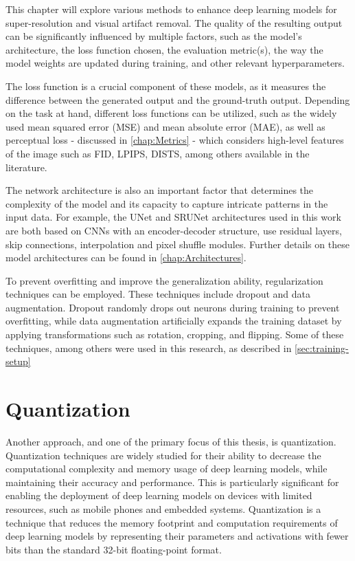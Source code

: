 \label{chap:Optimizations}

This chapter will explore various methods to enhance deep learning models for super-resolution and visual artifact removal. The quality of the resulting output can be significantly influenced by multiple factors, such as the model's architecture, the loss function chosen, the evaluation metric(s), the way the model weights are updated during training, and other relevant hyperparameters.

The loss function is a crucial component of these models, as it measures the difference between the generated output and the ground-truth output. Depending on the task at hand, different loss functions can be utilized, such as the widely used mean squared error (MSE) and mean absolute error (MAE), as well as perceptual loss - discussed in \cref{chap:Metrics} - which considers high-level features of the image such as FID, LPIPS, DISTS, among others available in the literature.

The network architecture is also an important factor that determines the complexity of the model and its capacity to capture intricate patterns in the input data. For example, the UNet and SRUNet architectures used in this work are both based on CNNs with an encoder-decoder structure, use residual layers, skip connections, interpolation and pixel shuffle modules. Further details on these model architectures can be found in \cref{chap:Architectures}.

To prevent overfitting and improve the generalization ability, regularization techniques can be employed. These techniques include dropout and data augmentation. Dropout randomly drops out neurons during training to prevent overfitting, while data augmentation artificially expands the training dataset by applying transformations such as rotation, cropping, and flipping. Some of these techniques, among others were used in this research, as described in \cref{sec:training-setup}

\section{Quantization}
\label{sec:quantization}

Another approach, and one of the primary focus of this thesis, is quantization. Quantization techniques are widely studied for their ability to decrease the computational complexity and memory usage of deep learning models, while maintaining their accuracy and performance. This is particularly significant for enabling the deployment of deep learning models on devices with limited resources, such as mobile phones and embedded systems. Quantization is a technique that reduces the memory footprint and computation requirements of deep learning models by representing their parameters and activations with fewer bits than the standard 32-bit floating-point format.

